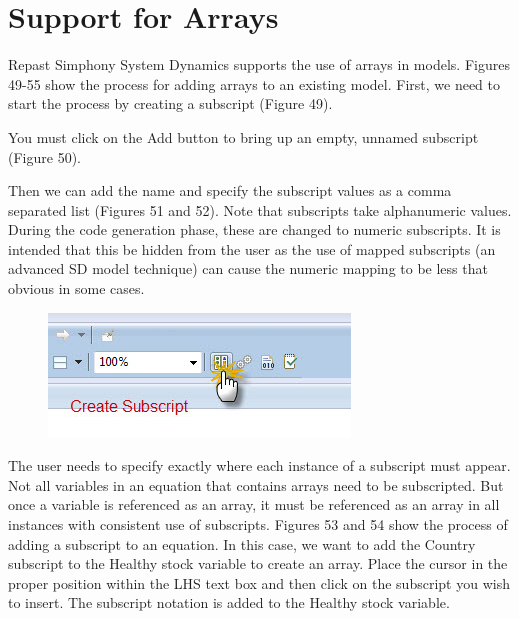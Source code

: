 \documentclass[11pt]{amsart}
\begin{document}
\section{Support for Arrays}
Repast Simphony System Dynamics supports the use of arrays in models. Figures 49-55 show the process for adding arrays to an existing model. First, we need to start the process by creating a subscript (Figure 49).


You must click on the Add button to bring up an empty, unnamed subscript (Figure 50).


Then we can add the name and specify the subscript values as a comma separated list (Figures 51 and 52). Note that subscripts take alphanumeric values. During the code generation phase, these are changed to numeric subscripts. It is intended that this be hidden from the user as the use of mapped subscripts (an advanced SD model technique) can cause the numeric mapping to be less that obvious in some cases.


\begin{figure}[ht]
\begin{center}
\vspace{.2in}
\centerline {
\includegraphics[totalheight=0.3\textheight]{images/052.jpg}
}
\caption{}
\label{fig:052}
\end{center}
\end{figure}

The user needs to specify exactly where each instance of a subscript must appear. Not all variables in an equation that contains arrays need to be subscripted. But once a variable is referenced as an array, it must be referenced as an array in all instances with consistent use of subscripts. Figures 53 and 54 show the process of adding a subscript to an equation. In this case, we want to add the Country subscript to the Healthy stock variable to create an array. Place the cursor in the proper position within the LHS text box and then click on the subscript you wish to insert. The subscript notation is added to the Healthy stock variable.
\end{document}
